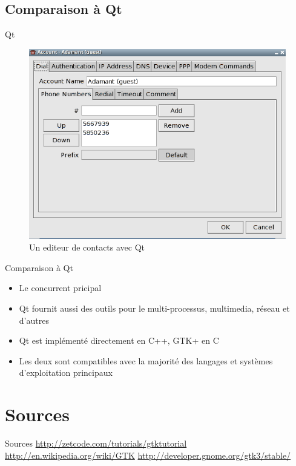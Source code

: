 \documentclass{beamer}
\begin{document}
  \subsection{Comparaison à Qt}
  \begin{frame}{Qt}
    \begin{figure}[htb]
    \centering
    \includegraphics[scale=0.45]{"qt"}
    \caption{Un editeur de contacts avec Qt}
    \label{fig:qt}
    \end{figure}
  \end{frame}
  \begin{frame}{Comparaison à Qt}
  \begin{itemize}
    \item Le concurrent pricipal\\
    \item Qt fournit aussi des outils pour le multi-processus, multimedia, réseau et d'autres\\
    \item Qt est implémenté directement en C++, GTK+ en C\\
    \item Les deux sont compatibles avec la majorité des langages et systèmes d'exploitation principaux
  \end{itemize}
  \end{frame}

  \section{Sources}
  \begin{frame}{Sources}
  	\url{http://zetcode.com/tutorials/gtktutorial}
		\url{http://en.wikipedia.org/wiki/GTK}
		\url{http://developer.gnome.org/gtk3/stable/}
  \end{frame}
\end{document}
